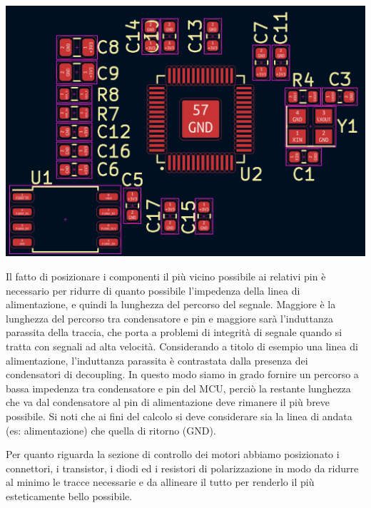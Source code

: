\begin{center}
\includegraphics[scale=0.3]{figures/image29.png}
\captionsetup{type=figure}
\end{center}

Il fatto di posizionare i componenti il più vicino possibile ai relativi
pin è necessario per ridurre di quanto possibile l'impedenza della linea
di alimentazione, e quindi la lunghezza del percorso del segnale.
Maggiore è la lunghezza del percorso tra condensatore e pin e maggiore
sarà l'induttanza parassita della traccia, che porta a problemi di
integrità di segnale quando si tratta con segnali ad alta velocità.
Considerando a titolo di esempio una linea di alimentazione,
l'induttanza parassita è contrastata dalla presenza dei condensatori di
decoupling. In questo modo siamo in grado fornire un percorso a bassa
impedenza tra condensatore e pin del MCU, perciò la restante lunghezza
che va dal condensatore al pin di alimentazione deve rimanere il più
breve possibile. Si noti che ai fini del calcolo si deve considerare sia
la linea di andata (es: alimentazione) che quella di ritorno (GND).

Per quanto riguarda la sezione di controllo dei motori abbiamo
posizionato i connettori, i transistor, i diodi ed i resistori di
polarizzazione in modo da ridurre al minimo le tracce necessarie e da
allineare il tutto per renderlo il più esteticamente bello possibile.

